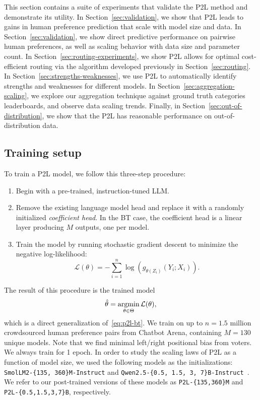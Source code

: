 This section contains a suite of experiments that validate the P2L method and demonstrate its utility.
In Section~\ref{sec:validation}, we show that P2L leads to gains in human preference prediction that scale with model size and data.
In Section~\ref{sec:validation}, we show direct predictive performance on pairwise human preferences, as well as scaling behavior with data size and parameter count.
In Section~\ref{sec:routing-experiments}, we show P2L allows for optimal cost-efficient routing via the algorithm developed previously in Section~\ref{sec:routing}.
In Section~\ref{sec:strengths-weaknesses}, we use P2L to automatically identify strengths and weaknesses for different models.
In Section~\ref{sec:aggregation-scaling}, we explore our aggregation technique against ground truth categories leaderboards, and observe data scaling trends.
Finally, in Section~\ref{sec:out-of-distribution}, we show that the P2L has reasonable performance on out-of-distribution data.

\subsection{Training setup}

To train a P2L model, we follow this three-step procedure:
\begin{enumerate}
    \item Begin with a pre-trained, instruction-tuned LLM.
    \item Remove the existing language model head and replace it with a randomly initialized \emph{coefficient head}. In the BT case, the coefficient head is a linear layer producing $M$ outputs, one per model.
    \item Train the model by running stochastic gradient descent to minimize the negative log-likelihood:
    \begin{equation}
        \mathcal{L}(\theta) = -\sum\limits_{i=1}^n \log \left( g_{\theta(Z_i)}(Y_i;X_i) \right).
    \end{equation}
\end{enumerate}
The result of this procedure is the trained model
\begin{equation}
    \hat\theta = \operatorname*{argmin}_{\theta \in \Theta} \mathcal{L}(\theta),
\end{equation}
which is a direct generalization of~\eqref{eq:p2l-bt}.
We train on up to $n=1.5$ million crowdsourced human preference pairs from Chatbot Arena, containing $M=130$ unique models. Note that we find minimal left/right positional bias from voters.
We always train for 1 epoch. 
In order to study the scaling laws of P2L as a function of model size, we used the following models as the initializations: \texttt{SmolLM2-\{135, 360\}M-Instruct} and \texttt{Qwen2.5-\{0.5, 1.5, 3, 7\}B-Instruct}~\citep{allal2024SmolLM2, qwen2.5}.
We refer to our post-trained versions of these models as \texttt{P2L-\{135,360\}M} and \texttt{P2L-\{0.5,1.5,3,7\}B}, respectively.


